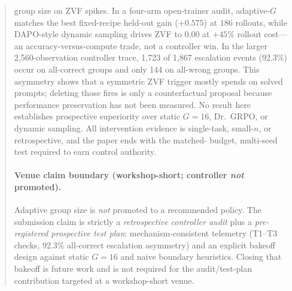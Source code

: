 \documentclass{article}
\begin{document}
\begin{abstract}
group size on ZVF spikes. In a four-arm open-trainer audit, adaptive-$G$
matches the best fixed-recipe held-out gain ($+0.575$) at $186$ rollouts,
while DAPO-style dynamic sampling drives ZVF to $0.00$ at $+45\%$ rollout
cost---an accuracy-versus-compute trade, not a controller win. In the larger
2,560-observation controller trace, 1,723 of 1,867 escalation events (92.3\%)
occur on all-correct groups and only 144 on all-wrong groups. This asymmetry
shows that a symmetric ZVF trigger mostly spends on solved prompts; deleting
those fires is only a counterfactual proposal because performance preservation
has not been measured. No result here establishes prospective superiority over
static $G{=}16$, Dr.~GRPO, or dynamic sampling. All intervention evidence is
single-task, small-$n$, or retrospective, and the paper ends with the matched-
budget, multi-seed test required to earn control authority.
\paragraph{Venue claim boundary (workshop-short; controller \emph{not} promoted).}
Adaptive group size is \emph{not} promoted to a recommended policy. The
submission claim is strictly a \emph{retrospective controller audit} plus a
\emph{pre-registered prospective test plan}: mechanism-consistent telemetry
(T1--T3 checks, 92.3\% all-correct escalation asymmetry) and an explicit
bakeoff design against static $G{=}16$ and naive boundary heuristics. Closing
that bakeoff is future work and is not required for the audit/test-plan
contribution targeted at a workshop-short venue.
\end{abstract}
 
\end{document}
